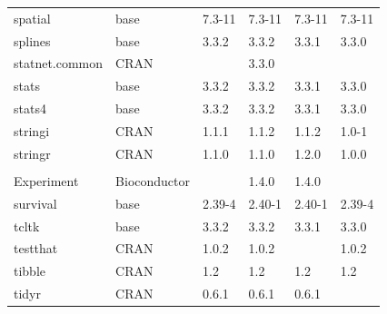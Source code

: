\begin{longtable}{llllll}
\rowcolor{black!10}
spatial                       & base                      & 7.3-11      & 7.3-11      & 7.3-11         & 7.3-11            \\
\rowcolor{black!5}
splines                       & base                      & 3.3.2       & 3.3.2       & 3.3.1          & 3.3.0              \\
\rowcolor{black!10}
statnet.common                & CRAN                      &             & 3.3.0       &                &                   \\
\rowcolor{black!5}
stats                         & base                      & 3.3.2       & 3.3.2       & 3.3.1          & 3.3.0              \\
\rowcolor{black!10}
stats4                        & base                      & 3.3.2       & 3.3.2       & 3.3.1          & 3.3.0             \\
\rowcolor{black!5}
stringi                       & CRAN                      & 1.1.1       & 1.1.2       & 1.1.2          & 1.0-1              \\
\rowcolor{black!10}
stringr                       & CRAN                      & 1.1.0       & 1.1.0       & 1.2.0          & 1.0.0             \\
\rowcolor{black!5}
\begin{tabular}[c]{@{}l@{}}Summarized\\Experiment \end{tabular}          & Bioconductor              &             & 1.4.0       & 1.4.0          &                    \\
\rowcolor{black!10}
survival                      & base                      & 2.39-4      & 2.40-1      & 2.40-1         & 2.39-4            \\
\rowcolor{black!5}
tcltk                         & base                      & 3.3.2       & 3.3.2       & 3.3.1          & 3.3.0              \\
\rowcolor{black!10}
testthat                      & CRAN                      & 1.0.2       & 1.0.2       &                & 1.0.2             \\
\rowcolor{black!5}
tibble                        & CRAN                      & 1.2         & 1.2         & 1.2            & 1.2                \\
\rowcolor{black!10}
tidyr                         & CRAN                      & 0.6.1       & 0.6.1       & 0.6.1          &                   \\

\end{longtable}
